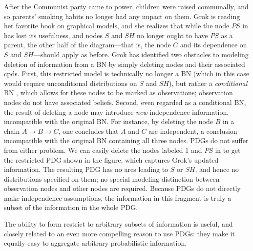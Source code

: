 \begin{example}[restriction]\label{ex:grok-ablate}
  After the Communist party came to power,
  children were raised communally, and so parents' smoking habits no longer had any impact on them. Grok is reading her favorite book on graphical models, and she realizes that while the node $\mathit{PS}$ in  has lost its usefulness, and nodes $S$ and $\mathit{SH}$ no longer ought to have $\mathit{PS}$ as a parent, the other half of the diagram---that is, the node $C$ and its dependence on $S$ and $\mathit{SH}$---should apply as before.
Grok has identified two obstacles to modeling deletion of information from a BN
by simply deleting nodes and their associated cpds. First, this restricted model
is technically no longer a BN (which in this case would require unconditional
distributions on $S$ and $\mathit{SH}$), but rather a \emph{conditional} BN
\citep{KF09}, which allows for these nodes to be marked as observations;
observation nodes do not have associated beliefs. Second, even regarded as a
conditional BN, the result of deleting a node may introduce \emph{new}
independence information, incompatible with the original BN. For instance, by
deleting the node $B$ in a chain $A \rightarrow B \rightarrow C$, one concludes
that $A$ and $C$ are independent, a conclusion incompatible with the original BN
containing all three nodes.   
PDGs do not suffer from either problem.  We can easily delete the
nodes labeled 1 and $PS$ in  to get the
restricted PDG shown in the figure, which captures Grok's updated information.
The resulting PDG has no arcs leading to $S$ or $\mathit{SH}$, and hence no
distributions specified on them; no special modeling distinction between
observation nodes and other nodes are required. Because PDGs do not directly
make independence assumptions, the information in this fragment is truly a
subset of the information in the whole PDG. 	
\end{example}

The ability to form restrict to arbitrary subsets of information is useful,
and closely related to an even more compelling reason to use PDGs:
they make it equally easy to aggregate arbitrary probabilistic information. 
	

